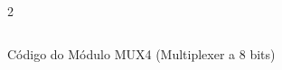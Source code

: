 \begin{figure}[H]
    \centering   
    \begin{tcolorbox}  
        \begin{multicols}{2} 
        \fontsize{9pt}{9pt}\selectfont\inputminted[obeytabs=true,tabsize=4,xleftmargin=20pt,linenos,breaklines]{VHDL}{VHDL/files/MUX8.vhd}    
        \end{multicols}
    \end{tcolorbox}   
    \caption{Código do Módulo MUX4 (Multiplexer a 8 bits)}
\end{figure}